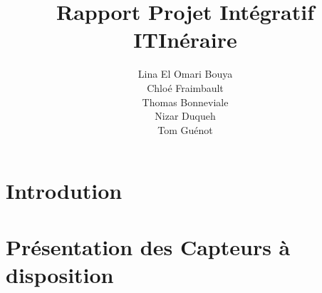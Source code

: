 \documentclass[a4paper]{article}
\title{Rapport Projet Intégratif ITInéraire}
\author{Lina El Omari Bouya \\ Chloé Fraimbault \\ Thomas Bonneviale \\ Nizar Duqueh \\ Tom Guénot }
\begin{document}
\begin{titlepage}
	\maketitle
\end{titlepage}

\renewcommand*\contentsname{Sommaire}
\tableofcontents

\newpage

\section{Introdution}
	
\newpage

\section{Présentation des Capteurs à disposition}
	
	\newpage
	
	\newpage
	
\end{document}
